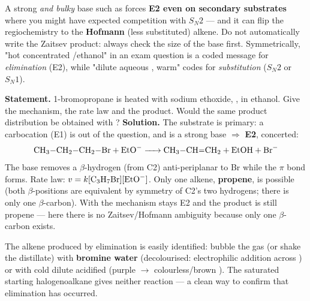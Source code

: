 \documentclass[11pt]{article}
\begin{document}
\begin{attention}
A strong \emph{and bulky} base such as  forces \textbf{E2 even on secondary substrates} where you might have expected competition with $S_N2$ — and it can flip the regiochemistry to the \textbf{Hofmann} (less substituted) alkene. Do not automatically write the Zaitsev product: always check the size of the base first. Symmetrically, "hot concentrated /ethanol" in an exam question is a coded message for \emph{elimination} (E2), while "dilute aqueous , warm" codes for \emph{substitution} ($S_N2$ or $S_N1$).
\end{attention}

\begin{exoresolu}
\textbf{Statement.} 1-bromopropane is heated with sodium ethoxide, , in ethanol. Give the mechanism, the rate law and the product. Would the same product distribution be obtained with ?
\tcblower
\textbf{Solution.} The substrate is primary: a carbocation (E1) is out of the question, and  is a strong base $\Rightarrow$ \textbf{E2}, concerted:
\[ \ce{CH3-CH2-CH2-Br + EtO- -> CH3-CH=CH2 + EtOH + Br-} \]
The base removes a $\beta$-hydrogen (from C2) anti-periplanar to Br while the $\pi$ bond forms. Rate law: $v = k[\ce{C3H7Br}][\ce{EtO-}]$. Only one alkene, \textbf{propene}, is possible (both $\beta$-positions are equivalent by symmetry of C2's two hydrogens; there is only one $\beta$-carbon). With  the mechanism stays E2 and the product is still propene — here there is no Zaitsev/Hofmann ambiguity because only one $\beta$-carbon exists.
\end{exoresolu}

\begin{experience}
The alkene produced by elimination is easily identified: bubble the gas (or shake the distillate) with \textbf{bromine water} (decolourised: electrophilic addition across ) or with cold dilute acidified  (purple $\rightarrow$ colourless/brown ). The saturated starting halogenoalkane gives neither reaction — a clean way to confirm that elimination has occurred.
\end{experience}
\end{document}
